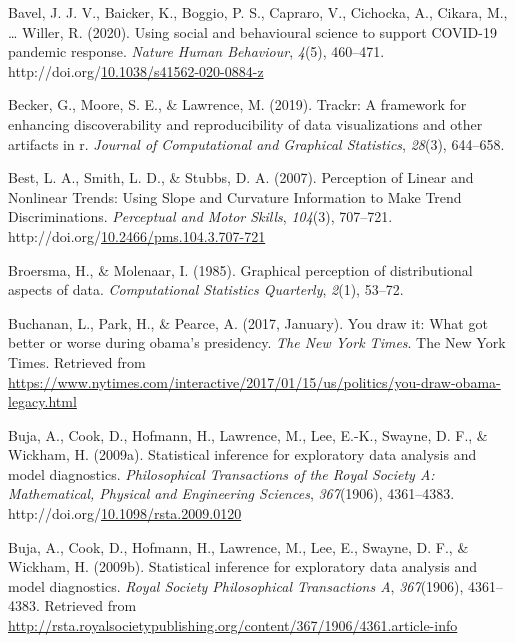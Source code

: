 \documentclass[print]{nuthesis}
\newlength{\cslhangindent}
\newenvironment{CSLReferences}%
{\setlength{\parindent}{0pt}%
\everypar{\setlength{\hangindent}{\cslhangindent}}\ignorespaces}%
{\par}
\begin{document}
\begin{CSLReferences}{1}{0}
\leavevmode{}%
Bavel, J. J. V., Baicker, K., Boggio, P. S., Capraro, V., Cichocka, A., Cikara, M., \ldots{} Willer, R. (2020). Using social and behavioural science to support {COVID}-19 pandemic response. \emph{Nature Human Behaviour}, \emph{4}(5), 460--471. http://doi.org/\href{https://doi.org/10.1038/s41562-020-0884-z}{10.1038/s41562-020-0884-z}

\leavevmode{}%
Becker, G., Moore, S. E., \& Lawrence, M. (2019). Trackr: A framework for enhancing discoverability and reproducibility of data visualizations and other artifacts in r. \emph{Journal of Computational and Graphical Statistics}, \emph{28}(3), 644--658.

\leavevmode{}%
Best, L. A., Smith, L. D., \& Stubbs, D. A. (2007). Perception of {Linear} and {Nonlinear} {Trends}: {Using} {Slope} and {Curvature} {Information} to {Make} {Trend} {Discriminations}. \emph{Perceptual and Motor Skills}, \emph{104}(3), 707--721. http://doi.org/\href{https://doi.org/10.2466/pms.104.3.707-721}{10.2466/pms.104.3.707-721}

\leavevmode{}%
Broersma, H., \& Molenaar, I. (1985). Graphical perception of distributional aspects of data. \emph{Computational Statistics Quarterly}, \emph{2}(1), 53--72.

\leavevmode{}%
Buchanan, L., Park, H., \& Pearce, A. (2017, January). You draw it: What got better or worse during obama's presidency. \emph{The New York Times}. The New York Times. Retrieved from \url{https://www.nytimes.com/interactive/2017/01/15/us/politics/you-draw-obama-legacy.html}

\leavevmode{}%
Buja, A., Cook, D., Hofmann, H., Lawrence, M., Lee, E.-K., Swayne, D. F., \& Wickham, H. (2009a). Statistical inference for exploratory data analysis and model diagnostics. \emph{Philosophical Transactions of the Royal Society A: Mathematical, Physical and Engineering Sciences}, \emph{367}(1906), 4361--4383. http://doi.org/\href{https://doi.org/10.1098/rsta.2009.0120}{10.1098/rsta.2009.0120}

\leavevmode{}%
Buja, A., Cook, D., Hofmann, H., Lawrence, M., Lee, E., Swayne, D. F., \& Wickham, H. (2009b). Statistical inference for exploratory data analysis and model diagnostics. \emph{Royal Society Philosophical Transactions A}, \emph{367}(1906), 4361--4383. Retrieved from \url{http://rsta.royalsocietypublishing.org/content/367/1906/4361.article-info}


\end{CSLReferences}
\end{document}
